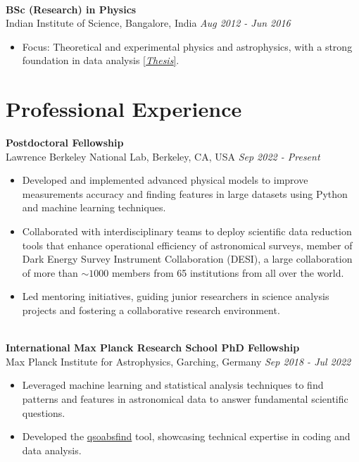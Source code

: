 \documentclass[a4paper,10pt]{article}
\begin{document}
\noindent\\
\textbf{BSc (Research) in Physics} \\
Indian Institute of Science, Bangalore, India \hfill \textit{Aug 2012 - Jun 2016} \\
\begin{itemize}[noitemsep, topsep=0pt]
    \item Focus: Theoretical and experimental physics and astrophysics, with a strong foundation in data analysis \href{https://raw.githubusercontent.com/abhi0395/mycv/main/files/BS_thesis.pdf}{[\textit{Thesis}]}.
\end{itemize}

\section*{Professional Experience}
\noindent
\textbf{Postdoctoral Fellowship} \\
Lawrence Berkeley National Lab, Berkeley, CA, USA \hfill \textit{Sep 2022 - Present} \\
\begin{itemize}[noitemsep, topsep=0pt]
    \item Developed and implemented advanced physical models to improve measurements accuracy and finding features in large datasets using Python and machine learning techniques.
    \item Collaborated with interdisciplinary teams to deploy scientific data reduction tools that enhance operational efficiency of astronomical surveys, member of Dark Energy Survey Instrument Collaboration (DESI), a large collaboration of more than $\sim1000$ members from 65 institutions from all over the world.
        \item Led mentoring initiatives, guiding junior researchers in science analysis projects and fostering a collaborative research environment.
\end{itemize}

\noindent \\
\textbf{International Max Planck Research School PhD Fellowship} \\
Max Planck Institute for Astrophysics, Garching, Germany \hfill \textit{Sep 2018 - Jul 2022} \\
\begin{itemize}[noitemsep, topsep=0pt]
    \item Leveraged machine learning and statistical analysis techniques to find patterns and features in astronomical data to answer fundamental scientific questions.
    \item Developed the \href{https://github.com/abhi0395/qsoabsfind}{qsoabsfind} tool, showcasing technical expertise in coding and data analysis.
\end{itemize}
\end{document}
